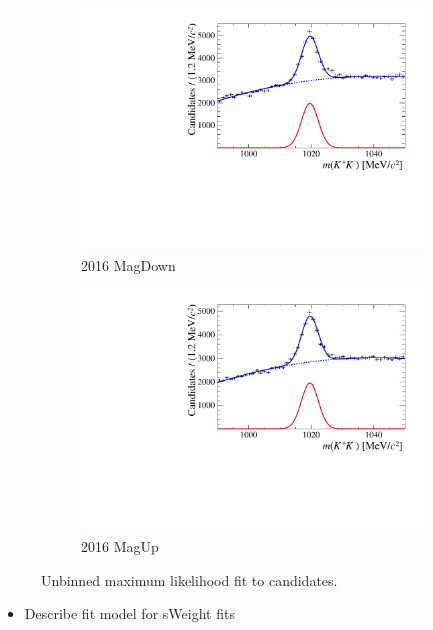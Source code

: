 \begin{figure}[!h]
   \centering
   \begin{subfigure}[t]{0.4\textwidth}
      \centering
      \includegraphics[width=1.0\textwidth]{figs/Selection/Fit_Data_Bs2JpsiPhi_Jpsi2MuMu_Phi2KK_2016_MagDown.pdf}
      \caption{\decay{\Bs}{\jpsi\phiz} 2016 MagDown}
   \end{subfigure}
   \begin{subfigure}[t]{0.4\textwidth}
      \centering
      \includegraphics[width=1.0\textwidth]{figs/Selection/Fit_Data_Bs2JpsiPhi_Jpsi2MuMu_Phi2KK_2016_MagUp.pdf}
      \caption{\decay{\Bs}{\jpsi\phiz} 2016 MagUp}
   \end{subfigure}
   \caption{Unbinned maximum likelihood fit to \decay{\Bs}{\jpsi\phiz} candidates.}
   \label{fig:mvatrainingsamples}   
\end{figure}
{\color{red}
\begin{itemize}
\item Describe fit model for sWeight fits
\end{itemize}
}

